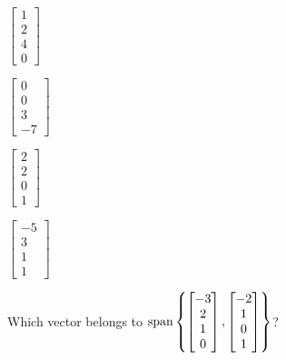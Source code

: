 \documentclass{article}
\begin{document}
\begin{readinessAssuranceTest}
  \begin{multicols}{4}
  \begin{readinessAssuranceTestChoices}
    \item \(
    \begin{bmatrix}
      1 \\ 2 \\ 4 \\ 0
    \end{bmatrix}
    \)
    \item \(
    \begin{bmatrix}
      0 \\ 0 \\ 3 \\ -7
    \end{bmatrix}
    \)
    \item \(
    \begin{bmatrix}
      2 \\ 2 \\ 0 \\ 1
    \end{bmatrix}
    \)
    \item \(
    \begin{bmatrix}
      -5 \\ 3 \\ 1 \\ 1
    \end{bmatrix}
    \) %
  \end{readinessAssuranceTestChoices}
  \end{multicols}

\item Which vector belongs to \(\operatorname{span}\left\{
\begin{bmatrix}
  -3 \\ 2 \\ 1 \\ 0
\end{bmatrix},
\begin{bmatrix}
  -2 \\ 1 \\ 0 \\ 1
\end{bmatrix}
\right\}\)?


\end{readinessAssuranceTest}
\end{document}
